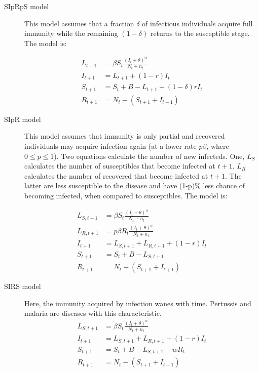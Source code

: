 \begin{description}
\item[SIpRpS model]
This model assumes that a fraction $\delta$ of infectious individuals acquire full immunity while the remaining $(1-\delta)$ returns to the susceptible stage. The model is:

\begin{align} \label{E:SIpRpSmodel}
        L_{t+1} &= \beta S_t \frac{(I_t+\theta)^\alpha} {N_t+n_t}\nonumber \\
        I_{t+1} &= L_{t+1} + (1-r)I_t\nonumber\\
        S_{t+1} &= S_t + B - L_{t+1} + (1-\delta) r I_t\nonumber\\
        R_{t+1} &= N_t-(S_{t+1}+I_{t+1})
\end{align}


\item[SIpR model]
This model assumes that immunity is only partial and recovered individuals may acquire infection again (at a  lower rate $p \beta$, where $0\leq p \leq 1$). Two equations calculate the number of new infecteds. One, $L_S$  calculates the number of susceptibles that become infected at $t+1$. $L_R$  calculates the number of recovered that become infected at $t+1$. The latter are less susceptible to the disease and have (1-p)\% less chance of becoming infected, when compared to susceptibles. The model is:

\begin{align} \label{E:SIpRmodel}
        L_{S,t+1} &= \beta S_t \frac{(I_t+\theta)^\alpha} {N_t+n_t}\nonumber \\
	L_{R,t+1} &= p \beta R_t \frac{(I_t+\theta)^\alpha} {N_t+n_t}\nonumber\\ 
        I_{t+1} &= L_{S,t+1} + L_{R,t+1} + (1-r)I_t\nonumber\\
        S_{t+1} &= S_t + B - L_{S,t+1} \nonumber\\
        R_{t+1} &= N_t-(S_{t+1}+I_{t+1}) 
\end{align}


\item[SIRS model]
Here, the immunity acquired by infection wanes with time. Pertussis and malaria are diseases with this characteristic.
\begin{align} \label{E:SIRSmodel}
        L_{S,t+1} &= \beta S_t \frac{(I_t+\theta)^\alpha} {N_t+n_t\nonumber} \\
	I_{t+1} &= L_{S,t+1} + L_{R,t+1} + (1-r)I_t\nonumber\\
        S_{t+1} &= S_t + B - L_{S,t+1} + w R_t\nonumber\\
        R_{t+1} &= N_t-(S_{t+1}+I_{t+1}) 
\end{align}


\end{description}


